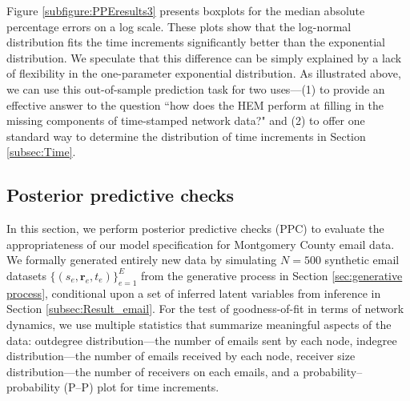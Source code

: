 \documentclass[ba]{imsart}
\def\spacingset#1{\renewcommand{\baselinestretch}%
	{#1}\small\normalsize} \spacingset{1}
\numberwithin{equation}{section}
\theoremstyle{plain}
\begin{document}
	Figure \ref{subfigure:PPEresults3} presents boxplots for the median absolute percentage errors on a log scale. These plots show that the log-normal distribution fits the time increments significantly better than the exponential distribution. We speculate that this difference can be simply explained by a lack of flexibility in the one-parameter exponential distribution. As illustrated above, we can use this out-of-sample prediction task for two uses---(1) to provide an effective answer to the question ``how does the HEM perform at filling in the missing components of time-stamped network data?" and (2) to offer one standard way to determine the distribution of time increments in Section \ref{subsec:Time}. 
	
	\subsection{Posterior predictive checks}\label{subsec:PPC_email} 	   
	In this section, we perform posterior predictive checks (PPC) \citep{rubin1984bayesianly} to evaluate the appropriateness of our model specification for Montgomery County email data. We formally generated entirely new data by simulating $N=500$ synthetic email datasets $\{(s_{e}, \boldsymbol{r}_{e}, t_{e})\}_{e=1}^E$ from the generative process in Section \ref{sec:generative process}, conditional upon a set of inferred latent variables from inference in Section \ref{subsec:Result_email}. For the test of goodness-of-fit in terms of network dynamics, we use multiple statistics that summarize meaningful aspects of the data: outdegree distribution---the number of emails sent by each node, indegree distribution---the number of emails received by each node, receiver size distribution---the number of receivers on each emails, and a probability--probability (P--P) plot for time increments. 

\end{document}

